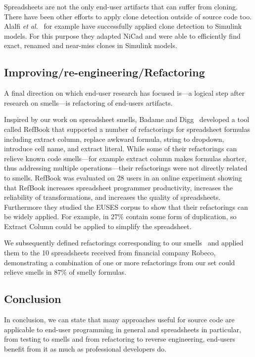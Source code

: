 \documentclass[conference]{IEEEtran}
\begin{document}
Spreadsheets are not the only end-user artifacts that can suffer from cloning. There have been other efforts to apply clone detection outside of source code too. Alalfi \emph{et al.}~\cite{DBLP:conf/icsm/Alalfi2012} for example have successfully applied clone detection to Simulink models. For this purpose they adapted NiCad and were able to efficiently find exact, renamed and near-miss clones in Simulink models.

\subsection{Improving/re-engineering/Refactoring}
A final direction on which end-user research has focused is---a logical step after research on smells---is refactoring of end-users artifacts. 


Inspired by our work on spreadsheet smells, Badame and Digg~\cite{badame_refactoring_2012} developed a tool called RefBook that supported a number of refactorings for spreadsheet formulas including extract column, replace awkward formula, string to dropdown, introduce cell name, and extract literal. While some of their refactorings can relieve known code smells---for example extract column makes formulas shorter, thus addressing multiple operations---their refactorings were not directly related to smells. RefBook was evaluated on 28 users in an online experiment showing that RefBook increases spreadsheet programmer
productivity, increases the reliability of transformations, and increases the quality of spreadsheets. Furthermore they studied the EUSES corpus to show that their refactorings can be widely applied. For example, in 27\% contain some form of duplication, so Extract Column could be applied to simplify the spreadsheet.

We subsequently defined refactorings corresponding to our smells~\cite{hermans_detecting_2014} and applied them to the 10 spreadsheets received from financial company Robeco, demonstrating a combination of one or more refactorings from our set could relieve smells in 87\% of smelly formulas.

\subsection{Conclusion}
In conclusion, we can state that many approaches useful for source code are applicable to end-user programming in general and spreadsheets in particular, from testing to smells and from refactoring to reverse engineering, end-users benefit from it as much as professional developers do.
\end{document}
